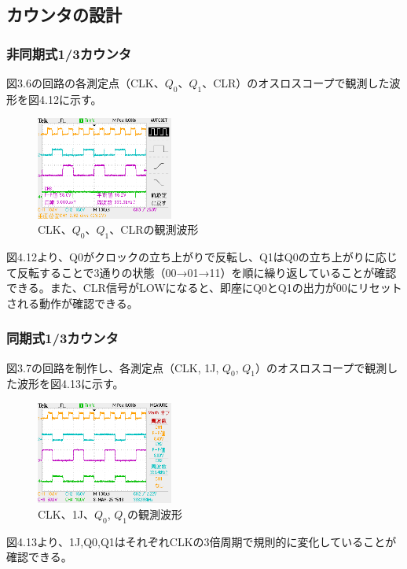 \documentclass{jlreq}
\numberwithin{equation}{section}
\begin{document}
\subsection{カウンタの設計}
\subsubsection{非同期式1/3カウンタ}
図3.6の回路の各測定点（CLK、\(Q_0\)、\(Q_1\)、CLR）のオスロスコープで観測した波形を図4.12に示す。

\begin{figure}[H]
  \centering
  \includegraphics[width=0.4\textwidth]{assets/hidouki.png}
  \caption{CLK、\(Q_0\)、\(Q_1\)、CLRの観測波形}
\end{figure}

図4.12より、Q0がクロックの立ち上がりで反転し、Q1はQ0の立ち上がりに応じて反転することで3通りの状態（00→01→11）を順に繰り返していることが確認できる。また、CLR信号がLOWになると、即座にQ0とQ1の出力が00にリセットされる動作が確認できる。

\subsubsection{同期式1/3カウンタ}
図3.7の回路を制作し、各測定点（CLK, 1J, \(Q_0\), \(Q_1\)）のオスロスコープで観測した波形を図4.13に示す。

\begin{figure}[H]
  \centering
  \includegraphics[width=0.4\textwidth]{assets/douki.png}
  \caption{CLK、1J、\(Q_0\), \(Q_1\)の観測波形}
\end{figure}

図4.13より、1J,Q0,Q1はそれぞれCLKの3倍周期で規則的に変化していることが確認できる。
\end{document}
